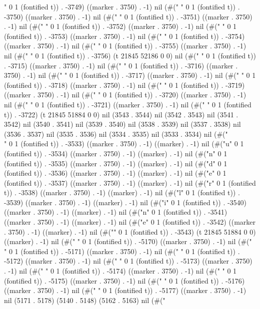 {" 0 1 (fontified t)) . -3749) ((marker . 3750) . -1) nil (#(" " 0 1 (fontified t)) . -3750) ((marker . 3750) . -1) nil (#(" " 0 1 (fontified t)) . -3751) ((marker . 3750) . -1) nil (#(" " 0 1 (fontified t)) . -3752) ((marker . 3750) . -1) nil (#(" " 0 1 (fontified t)) . -3753) ((marker . 3750) . -1) nil (#(" " 0 1 (fontified t)) . -3754) ((marker . 3750) . -1) nil (#(" " 0 1 (fontified t)) . -3755) ((marker . 3750) . -1) nil (#(" " 0 1 (fontified t)) . -3756) (t 21845 52186 0 0) nil (#("
" 0 1 (fontified t)) . -3715) ((marker . 3750) . -1) nil (#(" " 0 1 (fontified t)) . -3716) ((marker . 3750) . -1) nil (#(" " 0 1 (fontified t)) . -3717) ((marker . 3750) . -1) nil (#(" " 0 1 (fontified t)) . -3718) ((marker . 3750) . -1) nil (#(" " 0 1 (fontified t)) . -3719) ((marker . 3750) . -1) nil (#(" " 0 1 (fontified t)) . -3720) ((marker . 3750) . -1) nil (#(" " 0 1 (fontified t)) . -3721) ((marker . 3750) . -1) nil (#(" " 0 1 (fontified t)) . -3722) (t 21845 51884 0 0) nil (3543 . 3544) nil (3542 . 3543) nil (3541 . 3542) nil (3540 . 3541) nil (3539 . 3540) nil (3538 . 3539) nil (3537 . 3538) nil (3536 . 3537) nil (3535 . 3536) nil (3534 . 3535) nil (3533 . 3534) nil (#("\\" 0 1 (fontified t)) . -3533) ((marker . 3750) . -1) ((marker) . -1) nil (#("u" 0 1 (fontified t)) . -3534) ((marker . 3750) . -1) ((marker) . -1) nil (#("n" 0 1 (fontified t)) . -3535) ((marker . 3750) . -1) ((marker) . -1) nil (#("d" 0 1 (fontified t)) . -3536) ((marker . 3750) . -1) ((marker) . -1) nil (#("e" 0 1 (fontified t)) . -3537) ((marker . 3750) . -1) ((marker) . -1) nil (#("r" 0 1 (fontified t)) . -3538) ((marker . 3750) . -1) ((marker) . -1) nil (#("l" 0 1 (fontified t)) . -3539) ((marker . 3750) . -1) ((marker) . -1) nil (#("i" 0 1 (fontified t)) . -3540) ((marker . 3750) . -1) ((marker) . -1) nil (#("n" 0 1 (fontified t)) . -3541) ((marker . 3750) . -1) ((marker) . -1) nil (#("e" 0 1 (fontified t)) . -3542) ((marker . 3750) . -1) ((marker) . -1) nil (#("{" 0 1 (fontified t)) . -3543) (t 21845 51884 0 0) ((marker) . -1) nil (#("
" 0 1 (fontified t)) . -5170) ((marker . 3750) . -1) nil (#(" " 0 1 (fontified t)) . -5171) ((marker . 3750) . -1) nil (#(" " 0 1 (fontified t)) . -5172) ((marker . 3750) . -1) nil (#(" " 0 1 (fontified t)) . -5173) ((marker . 3750) . -1) nil (#(" " 0 1 (fontified t)) . -5174) ((marker . 3750) . -1) nil (#(" " 0 1 (fontified t)) . -5175) ((marker . 3750) . -1) nil (#(" " 0 1 (fontified t)) . -5176) ((marker . 3750) . -1) nil (#(" " 0 1 (fontified t)) . -5177) ((marker . 3750) . -1) nil (5171 . 5178) (5140 . 5148) (5162 . 5163) nil (#("
}}
